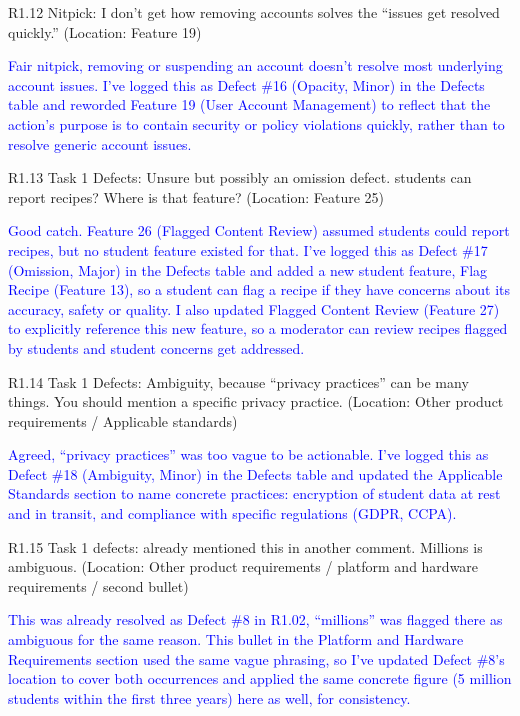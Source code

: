 \documentclass[10pt,letterpaper]{article}
\begin{document}
R1.12 Nitpick: I don't get how removing accounts solves the ``issues get resolved quickly.'' (Location: Feature 19)

\textcolor{blue}{Fair nitpick, removing or suspending an account doesn't resolve most underlying account issues. I've logged this as Defect \#16 (Opacity, Minor) in the Defects table and reworded Feature 19 (User Account Management) to reflect that the action's purpose is to contain security or policy violations quickly, rather than to resolve generic account issues.}

R1.13 Task 1 Defects: Unsure but possibly an omission defect. students can report recipes? Where is that feature? (Location: Feature 25)

\textcolor{blue}{Good catch. Feature 26 (Flagged Content Review) assumed students could report recipes, but no student feature existed for that. I've logged this as Defect \#17 (Omission, Major) in the Defects table and added a new student feature, Flag Recipe (Feature 13), so a student can flag a recipe if they have concerns about its accuracy, safety or quality. I also updated Flagged Content Review (Feature 27) to explicitly reference this new feature, so a moderator can review recipes flagged by students and student concerns get addressed.}

R1.14 Task 1 Defects: Ambiguity, because ``privacy practices'' can be many things. You should mention a specific privacy practice. (Location: Other product requirements / Applicable standards)

\textcolor{blue}{Agreed, ``privacy practices'' was too vague to be actionable. I've logged this as Defect \#18 (Ambiguity, Minor) in the Defects table and updated the Applicable Standards section to name concrete practices: encryption of student data at rest and in transit, and compliance with specific regulations (GDPR, CCPA).}

R1.15 Task 1 defects: already mentioned this in another comment. Millions is ambiguous. (Location: Other product requirements / platform and hardware requirements / second bullet)

\textcolor{blue}{This was already resolved as Defect \#8 in R1.02, ``millions'' was flagged there as ambiguous for the same reason. This bullet in the Platform and Hardware Requirements section used the same vague phrasing, so I've updated Defect \#8's location to cover both occurrences and applied the same concrete figure (5 million students within the first three years) here as well, for consistency.}
\end{document}
